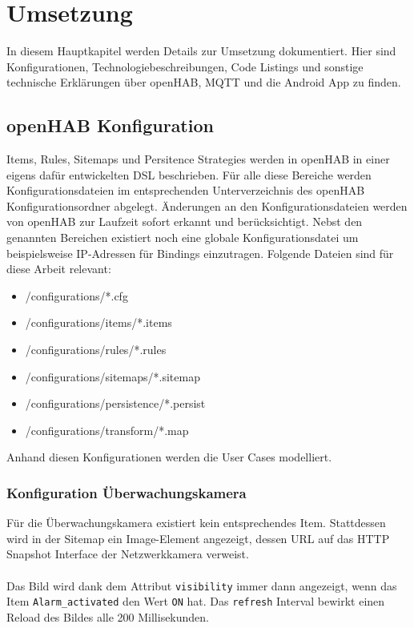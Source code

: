 \section{Umsetzung}
\label{sec:chapterRealization}

In diesem Hauptkapitel werden Details zur Umsetzung dokumentiert. Hier sind Konfigurationen, Technologiebeschreibungen, Code Listings und sonstige technische Erklärungen über openHAB, MQTT und die Android App zu finden.


\subsection{openHAB Konfiguration}
Items, Rules, Sitemaps und Persitence Strategies werden in openHAB in einer eigens dafür entwickelten DSL beschrieben. Für alle diese Bereiche werden Konfigurationsdateien im entsprechenden Unterverzeichnis des openHAB Konfigurationsordner abgelegt. Änderungen an den Konfigurationsdateien werden von openHAB zur Laufzeit sofort erkannt und berücksichtigt. Nebst den genannten Bereichen existiert noch eine globale Konfigurationsdatei um beispielsweise IP-Adressen für Bindings einzutragen. Folgende Dateien sind für diese Arbeit relevant:

\begin{itemize}
	\item /configurations/*.cfg
	\item /configurations/items/*.items
	\item /configurations/rules/*.rules
	\item /configurations/sitemaps/*.sitemap
	\item /configurations/persistence/*.persist
	\item /configurations/transform/*.map
\end{itemize}

Anhand diesen Konfigurationen werden die User Cases modelliert.

\subsubsection{Konfiguration Überwachungskamera} 
Für die Überwachungskamera existiert kein entsprechendes Item. Stattdessen wird in der Sitemap ein Image-Element angezeigt, dessen URL auf das HTTP Snapshot Interface der Netzwerkkamera verweist.\\ \\
Das Bild wird dank dem Attribut \lstinline!visibility!  immer dann angezeigt, wenn das Item \lstinline!Alarm_activated! den Wert \lstinline!ON! hat. Das \lstinline!refresh! Interval bewirkt einen Reload des Bildes alle 200 Millisekunden.

